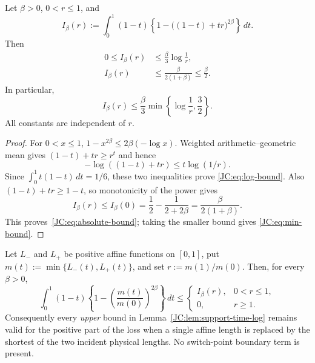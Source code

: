 \begin{lemma}
\label{JC:lem:support-time-log}
Let $\beta>0$, $0<r\le1$, and
\begin{equation}\label{JC:eq:I-beta}
 I_\beta(r):=\int_0^1(1-t)
 \left\{1-\bigl((1-t)+tr\bigr)^{2\beta}\right\}\,dt.
\end{equation}
Then
\begin{align}
 0\le I_\beta(r)
 &\le\frac\beta3\log\frac1r,\label{JC:eq:log-bound}\\
 I_\beta(r)
 &\le\frac{\beta}{2(1+\beta)}\le\frac\beta2.\label{JC:eq:absolute-bound}
\end{align}
In particular,
\begin{equation}\label{JC:eq:min-bound}
 \boxed{I_\beta(r)\le\frac\beta3
 \min\left\{\log\frac1r,\frac32\right\}.}
\end{equation}
All constants are independent of $r$.
\end{lemma}

\begin{proof}
For $0<x\le1$, $1-x^{2\beta}\le2\beta(-\log x)$.
Weighted arithmetic--geometric mean gives
$(1-t)+tr\ge r^t$ and hence
\[
 -\log((1-t)+tr)\le t\log(1/r).
\]
Since $\int_0^1t(1-t)\,dt=1/6$, these two inequalities prove
\eqref{JC:eq:log-bound}.  Also $(1-t)+tr\ge1-t$, so monotonicity of the
power gives
\[
 I_\beta(r)\le I_\beta(0)
 =\frac12-\frac1{2+2\beta}
 =\frac\beta{2(1+\beta)}.
\]
This proves~\eqref{JC:eq:absolute-bound}; taking the smaller bound gives
\eqref{JC:eq:min-bound}.
\end{proof}

\begin{lemma}
\label{JC:lem:support-time-min}
Let $L_-$ and $L_+$ be positive affine functions on $[0,1]$, put
$m(t):=\min\{L_-(t),L_+(t)\}$, and set $r:=m(1)/m(0)$.  Then, for every
$\beta>0$,
\begin{equation}\label{JC:eq:min-affine-payment}
 \int_0^1(1-t)\left\{1-
 \left(\frac{m(t)}{m(0)}\right)^{2\beta}\right\}\,dt
 \le
 \begin{cases}
 I_\beta(r),&0<r\le1,\\
 0,&r\ge1.
 \end{cases}
\end{equation}
Consequently every \emph{upper} bound in
Lemma~\ref{JC:lem:support-time-log} remains valid for the positive part of the
loss when a single affine length is replaced by the shortest of the two
incident physical lengths.  No switch-point boundary term is present.
\end{lemma}

